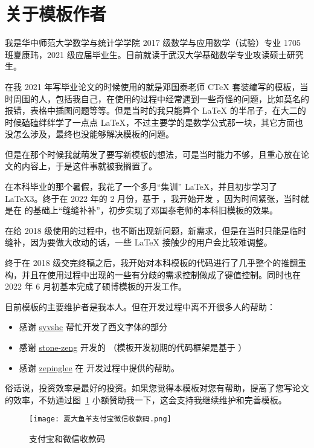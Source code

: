
\section{关于模板作者}

我是华中师范大学数学与统计学学院 2017 级数学与应用数学（试验）专业 1705 班夏康玮，2021 级应届毕业生。目前就读于武汉大学基础数学专业攻读硕士研究生。

在我 2021 年写毕业论文的时候使用的就是邓国泰老师 CTeX 套装编写的模板，当时周围的人，包括我自己，在使用的过程中经常遇到一些奇怪的问题，比如莫名的报错，表格中插图问题等等。但是当时的我只能算个 \LaTeX{} 的半吊子，在大二的时候磕磕绊绊学了一点点 \LaTeX{}，不过主要学的是数学公式那一块，其它方面也没怎么涉及，最终也没能够解决模板的问题。

但是在那个时候我就萌发了要写新模板的想法，可是当时能力不够，且重心放在论文的内容上，于是这件事就被我搁置了。

在本科毕业的那个暑假，我花了一个多月“集训” \LaTeX{}，并且初步学习了 \LaTeX3。终于在 2022 年的 2 月份，基于 ，我开始开发 ，因为时间紧张，当时就是在  的基础上“缝缝补补”，初步实现了邓国泰老师的本科旧模板的效果。

在给 2018 级使用的过程中，也不断出现新问题，新需求，但是在当时只能是临时缝补，因为要做大改动的话，一些 \LaTeX{} 接触少的用户会比较难调整。

终于在 2018 级交完终稿之后，我开始对本科模板的代码进行了几乎整个的推翻重构，并且在使用过程中出现的一些有分歧的需求控制做成了键值控制。同时也在 2022 年 6 月初基本完成了硕博模板的开发工作。

目前模板的主要维护者是我本人。但在开发过程中离不开很多人的帮助：
\begin{itemize}
  \item 感谢 \href{https://github.com/syvshc}{syvshc} 帮忙开发了西文字体的部分
  \item 感谢 \href{https://github.com/stone-zeng}{stone-zeng} 开发的  （模板开发初期的代码框架是基于 ）
  \item 感谢 \href{https://github.com/zepinglee}{zepinglee} 在  开发过程中提供的帮助。
\end{itemize}

俗话说，投资效率是最好的投资。如果您觉得本模板对您有帮助，提高了您写论文的效率，不妨通过图~\ref{figure:alipay-wechat} 小额赞助我一下，这会支持我继续维护和完善模板。

\begin{figure}[htbp]
  \centering
  \texttt{[image: 夏大鱼羊支付宝微信收款码.png]}
  \caption{支付宝和微信收款码}
  \label{figure:alipay-wechat}
\end{figure}